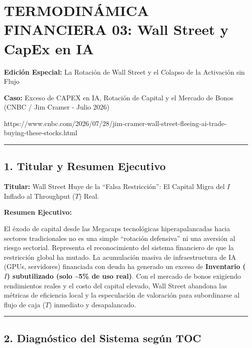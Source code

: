 \documentclass[12pt,letterpaper]{article}
\begin{document}
\hypertarget{termodinuxe1mica-financiera-03-wall-street-y-capex-en-ia}{%
\section{TERMODINÁMICA FINANCIERA 03: Wall Street y CapEx en
IA}\label{termodinuxe1mica-financiera-03-wall-street-y-capex-en-ia}}

\textbf{Edición Especial:} La Rotación de Wall Street y el Colapso de la
Activación sin Flujo

\textbf{Caso:} Exceso de CAPEX en IA, Rotación de Capital y el Mercado
de Bonos (CNBC / Jim Cramer - Julio 2026)

https://www.cnbc.com/2026/07/28/jim-cramer-wall-street-fleeing-ai-trade-buying-these-stocks.html

\begin{center}\rule{0.5\linewidth}{0.5pt}\end{center}

\hypertarget{titular-y-resumen-ejecutivo}{%
\subsection{1. Titular y Resumen
Ejecutivo}\label{titular-y-resumen-ejecutivo}}

\textbf{Titular:} Wall Street Huye de la ``Falsa Restricción'': El
Capital Migra del \(I\) Inflado al Throughput (\(T\)) Real.

\textbf{Resumen Ejecutivo:}

El éxodo de capital desde las Megacaps tecnológicas hiperapalancadas
hacia sectores tradicionales no es una simple ``rotación defensiva'' ni
una aversión al riesgo sectorial. Representa el reconocimiento del
sistema financiero de que la restricción global ha mutado. La
acumulación masiva de infraestructura de IA (GPUs, servidores)
financiada con deuda ha generado un exceso de \textbf{Inventario (\(I\))
subutilizado (solo \textasciitilde5\% de uso real)}. Con el mercado de
bonos exigiendo rendimientos reales y el costo del capital elevado, Wall
Street abandona las métricas de eficiencia local y la especulación de
valoración para subordinarse al flujo de caja (\(T\)) inmediato y
desapalancado.

\begin{center}\rule{0.5\linewidth}{0.5pt}\end{center}

\hypertarget{diagnuxf3stico-del-sistema-seguxfan-toc}{%
\subsection{2. Diagnóstico del Sistema según
TOC}\label{diagnuxf3stico-del-sistema-seguxfan-toc}}
\end{document}
